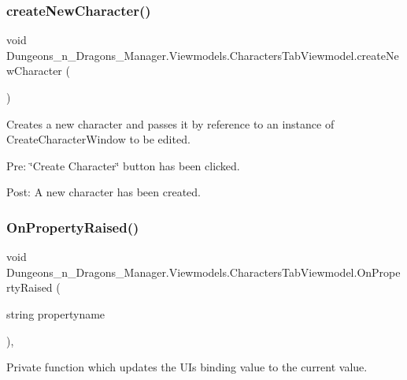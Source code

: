 \subsubsection{\texorpdfstring{create\+New\+Character()}{createNewCharacter()}}
{\footnotesize\ttfamily void Dungeons\+\_\+n\+\_\+\+Dragons\+\_\+\+Manager.\+Viewmodels.\+Characters\+Tab\+Viewmodel.\+create\+New\+Character (\begin{DoxyParamCaption}{ }\end{DoxyParamCaption})\hspace{0.3cm}{\ttfamily [inline]}}



Creates a new character and passes it by reference to an instance of Create\+Character\+Window to be edited. 

Pre\+: \char`\"{}\+Create Character\char`\"{} button has been clicked.

Post\+: A new character has been created. \mbox{\label{class_dungeons__n___dragons___manager_1_1_viewmodels_1_1_characters_tab_viewmodel_aebf6ce070fbb447adb5dbc456051d706}} 
\subsubsection{\texorpdfstring{On\+Property\+Raised()}{OnPropertyRaised()}}
{\footnotesize\ttfamily void Dungeons\+\_\+n\+\_\+\+Dragons\+\_\+\+Manager.\+Viewmodels.\+Characters\+Tab\+Viewmodel.\+On\+Property\+Raised (\begin{DoxyParamCaption}\item[{string}]{propertyname }\end{DoxyParamCaption})\hspace{0.3cm}{\ttfamily [inline]}, {\ttfamily [private]}}



Private function which updates the UI\textquotesingle{}s binding value to the current value. 

